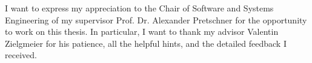 \documentclass[../main.tex]{subfiles}
\begin{document}
\thispagestyle{empty}

\vspace*{2cm}

\begin{center}
 { \myAcknowTitle}
\end{center}

\vspace{1cm}
\noindent
I want to express my appreciation to the Chair of Software and Systems Engineering of my supervisor Prof. Dr. Alexander Pretschner for the opportunity to work on this thesis.
In particular, I want to thank my advisor Valentin Zielgmeier for his patience, all the helpful hints, and the detailed feedback I received.
\end{document}
